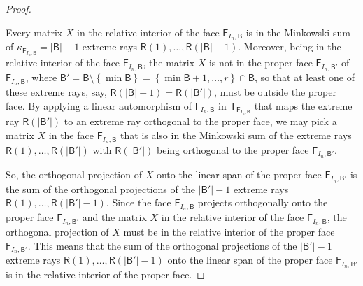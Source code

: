\documentclass[oneside]{amsart}
\theoremstyle{plain}
\theoremstyle{definition}
\theoremstyle{remark}
\numberwithin{equation}{section}
\begin{document}
\begin{proof}
\begin{enumerate}[label=(\roman*)]
\end{enumerate}

Every matrix $X$ in the relative interior of the face
$\mathsf{F}_{I_{n},\mathsf{B}}$ is in the Minkowski sum of
$\kappa_{\mathsf{F}_{I_{n},\mathsf{B}}} = \lvert \mathsf{B} \rvert - 1$
extreme rays $\mathsf{R}(1), \dotsc, \mathsf{R}(\lvert \mathsf{B} \rvert -
1)$. Moreover, being in the relative interior of the face
$\mathsf{F}_{I_{n},\mathsf{B}}$, the matrix $X$ is not in the proper face
$\mathsf{F}_{I_{n},\mathsf{B}'}$ of $\mathsf{F}_{I_{n},\mathsf{B}}$, where
$\mathsf{B}' = \mathsf{B} \setminus \left\{\min \mathsf{B}\right\} =
\left\{\min \mathsf{B}+1, \dotsc, r\right\} \cap \mathsf{B}$, so that at
least one of these extreme rays, say, $\mathsf{R}(\lvert \mathsf{B} \rvert
- 1) = \mathsf{R}(\lvert \mathsf{B}' \rvert)$, must be outside the proper
face. By applying a linear automorphism of $\mathsf{F}_{I_{n},\mathsf{B}}$
in $\mathsf{T}_{\mathsf{F}_{I_{n},\mathsf{B}}}$ that maps the extreme ray
$\mathsf{R}(\lvert \mathsf{B}' \rvert)$ to an extreme ray orthogonal to the
proper face, we may pick a matrix $X$ in the face
$\mathsf{F}_{I_{n},\mathsf{B}}$ that is also in the Minkowski sum of the
extreme rays $\mathsf{R}(1), \dotsc, \mathsf{R}(\lvert \mathsf{B}' \rvert)$
with $\mathsf{R}(\lvert \mathsf{B}' \rvert)$ being orthogonal to the proper
face $\mathsf{F}_{I_{n},\mathsf{B}'}$.

So, the orthogonal projection of $X$ onto the linear span of the proper
face $\mathsf{F}_{I_{n},\mathsf{B}'}$ is the sum of the orthogonal
projections of the $\lvert \mathsf{B}' \rvert - 1$ extreme rays
$\mathsf{R}(1), \dotsc, \mathsf{R}(\lvert \mathsf{B}' \rvert - 1)$. Since
the face $\mathsf{F}_{I_{n},\mathsf{B}}$ projects orthogonally onto the
proper face $\mathsf{F}_{I_{n},\mathsf{B}'}$ and the matrix $X$ in the
relative interior of the face $\mathsf{F}_{I_{n},\mathsf{B}}$, the
orthogonal projection of $X$ must be in the relative interior of the proper
face $\mathsf{F}_{I_{n},\mathsf{B}'}$. This means that the sum of the
orthogonal projections of the $\lvert \mathsf{B}' \rvert - 1$ extreme rays
$\mathsf{R}(1), \dotsc, \mathsf{R}(\lvert \mathsf{B}' \rvert - 1)$ onto the
linear span of the proper face $\mathsf{F}_{I_{n},\mathsf{B}'}$ is in the
relative interior of the proper face.


\end{proof}
\end{document}
